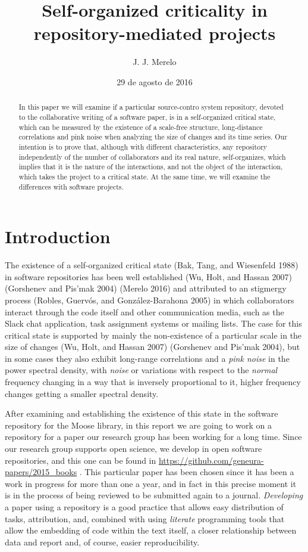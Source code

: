 \documentclass[]{article}
\title{Self-organized criticality in repository-mediated projects}
\author{J. J. Merelo}
\date{29 de agosto de 2016}
\begin{document}
\maketitle
\begin{abstract}
In this paper we will examine if a particular source-contro system
repository, devoted to the collaborative writing of a software paper, is
in a self-organized critical state, which can be measured by the
existence of a scale-free structure, long-distance correlations and pink
noise when analyzing the size of changes and its time series. Our
intention is to prove that, although with different characteristics, any
repository independently of the number of collaborators and its real
nature, self-organizes, which implies that it is the nature of the
interactions, and not the object of the interaction, which takes the
project to a critical state. At the same time, we will examine the
differences with software projects.
\end{abstract}

\section{Introduction}\label{introduction}

The existence of a self-organized critical state (Bak, Tang, and
Wiesenfeld 1988) in software repositories has been well established (Wu,
Holt, and Hassan 2007) (Gorshenev and Pis'mak 2004) (Merelo 2016) and
attributed to an stigmergy process (Robles, Guervós, and
González-Barahona 2005) in which collaborators interact through the code
itself and other communication media, such as the Slack chat
application, task assignment systems or mailing lists. The case for this
critical state is supported by mainly the non-existence of a particular
scale in the size of changes (Wu, Holt, and Hassan 2007) (Gorshenev and
Pis'mak 2004), but in some cases they also exhibit long-range
correlations and a \emph{pink noise} in the power spectral density, with
\emph{noise} or variations with respect to the \emph{normal} frequency
changing in a way that is inversely proportional to it, higher frequency
changes getting a smaller spectral density.

After examining and establishing the existence of this state in the
software repository for the Moose library, in this report we are going
to work on a repository for a paper our research group has been working
for a long time. Since our research group supports open science, we
develop in open software repositories, and this one can be found in
\url{https://github.com/geneura-papers/2015_books} . This particular
paper has been chosen since it has been a work in progress for more than
one a year, and in fact in this precise moment it is in the process of
being reviewed to be submitted again to a journal. \emph{Developing} a
paper using a repository is a good practice that allows easy
distribution of tasks, attribution, and, combined with using
\emph{literate} programming tools that allow the embedding of code
within the text itself, a closer relationship between data and report
and, of course, easier reproducibility.
\end{document}
